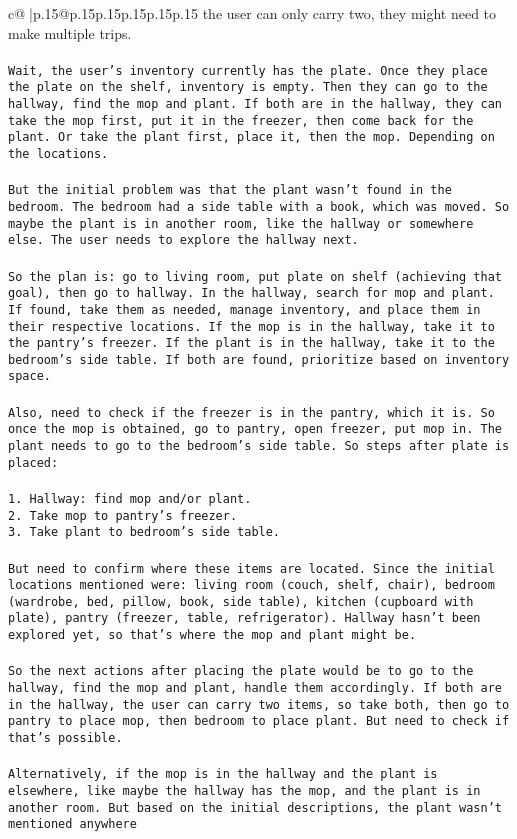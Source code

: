 \documentclass{article}
\begin{document}
{\begin{supertabular}{c@{$\;$}|p{.15\linewidth}@{}p{.15\linewidth}p{.15\linewidth}p{.15\linewidth}p{.15\linewidth}p{.15\linewidth}}
{{{the user can only carry two, they might need to make multiple trips.\\ \tt \\ \tt Wait, the user's inventory currently has the plate. Once they place the plate on the shelf, inventory is empty. Then they can go to the hallway, find the mop and plant. If both are in the hallway, they can take the mop first, put it in the freezer, then come back for the plant. Or take the plant first, place it, then the mop. Depending on the locations.\\ \tt \\ \tt But the initial problem was that the plant wasn't found in the bedroom. The bedroom had a side table with a book, which was moved. So maybe the plant is in another room, like the hallway or somewhere else. The user needs to explore the hallway next.\\ \tt \\ \tt So the plan is: go to living room, put plate on shelf (achieving that goal), then go to hallway. In the hallway, search for mop and plant. If found, take them as needed, manage inventory, and place them in their respective locations. If the mop is in the hallway, take it to the pantry's freezer. If the plant is in the hallway, take it to the bedroom's side table. If both are found, prioritize based on inventory space.\\ \tt \\ \tt Also, need to check if the freezer is in the pantry, which it is. So once the mop is obtained, go to pantry, open freezer, put mop in. The plant needs to go to the bedroom's side table. So steps after plate is placed:\\ \tt \\ \tt 1. Hallway: find mop and/or plant.\\ \tt 2. Take mop to pantry's freezer.\\ \tt 3. Take plant to bedroom's side table.\\ \tt \\ \tt But need to confirm where these items are located. Since the initial locations mentioned were: living room (couch, shelf, chair), bedroom (wardrobe, bed, pillow, book, side table), kitchen (cupboard with plate), pantry (freezer, table, refrigerator). Hallway hasn't been explored yet, so that's where the mop and plant might be.\\ \tt \\ \tt So the next actions after placing the plate would be to go to the hallway, find the mop and plant, handle them accordingly. If both are in the hallway, the user can carry two items, so take both, then go to pantry to place mop, then bedroom to place plant. But need to check if that's possible.\\ \tt \\ \tt Alternatively, if the mop is in the hallway and the plant is elsewhere, like maybe the hallway has the mop, and the plant is in another room. But based on the initial descriptions, the plant wasn't mentioned anywhere }}}
\end{supertabular}}
\end{document}
